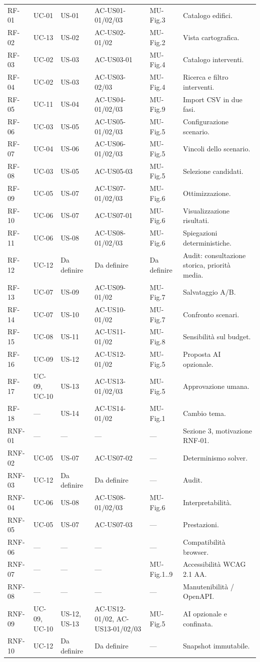\begin{longtable}{p{1.2cm} p{2.2cm} p{2.2cm} p{3.4cm} p{2.6cm} p{4cm}}
RF-01 & UC-01 & US-01 & AC-US01-01/02/03 & MU-Fig.3 & Catalogo edifici. \\
RF-02 & UC-13 & US-02 & AC-US02-01/02 & MU-Fig.2 & Vista cartografica. \\
RF-03 & UC-02 & US-03 & AC-US03-01 & MU-Fig.4 & Catalogo interventi. \\
RF-04 & UC-02 & US-03 & AC-US03-02/03 & MU-Fig.4 & Ricerca e filtro interventi. \\
RF-05 & UC-11 & US-04 & AC-US04-01/02/03 & MU-Fig.9 & Import CSV in due fasi. \\
RF-06 & UC-03 & US-05 & AC-US05-01/02/03 & MU-Fig.5 & Configurazione scenario. \\
RF-07 & UC-04 & US-06 & AC-US06-01/02/03 & MU-Fig.5 & Vincoli dello scenario. \\
RF-08 & UC-03 & US-05 & AC-US05-03 & MU-Fig.5 & Selezione candidati. \\
RF-09 & UC-05 & US-07 & AC-US07-01/02/03 & MU-Fig.6 & Ottimizzazione. \\
RF-10 & UC-06 & US-07 & AC-US07-01 & MU-Fig.6 & Visualizzazione risultati. \\
RF-11 & UC-06 & US-08 & AC-US08-01/02/03 & MU-Fig.6 & Spiegazioni deterministiche. \\
RF-12 & UC-12 & Da definire & Da definire & Da definire & Audit: consultazione storica, priorità media. \\
RF-13 & UC-07 & US-09 & AC-US09-01/02 & MU-Fig.7 & Salvataggio A/B. \\
RF-14 & UC-07 & US-10 & AC-US10-01/02 & MU-Fig.7 & Confronto scenari. \\
RF-15 & UC-08 & US-11 & AC-US11-01/02 & MU-Fig.8 & Sensibilità sul budget. \\
RF-16 & UC-09 & US-12 & AC-US12-01/02 & MU-Fig.5 & Proposta AI opzionale. \\
RF-17 & UC-09, UC-10 & US-13 & AC-US13-01/02/03 & MU-Fig.5 & Approvazione umana. \\
RF-18 & --- & US-14 & AC-US14-01/02 & MU-Fig.1 & Cambio tema. \\
\midrule
RNF-01 & --- & --- & --- & --- & Sezione 3, motivazione RNF-01. \\
RNF-02 & UC-05 & US-07 & AC-US07-02 & --- & Determinismo solver. \\
RNF-03 & UC-12 & Da definire & Da definire & --- & Audit. \\
RNF-04 & UC-06 & US-08 & AC-US08-01/02/03 & MU-Fig.6 & Interpretabilità. \\
RNF-05 & UC-05 & US-07 & AC-US07-03 & --- & Prestazioni. \\
RNF-06 & --- & --- & --- & --- & Compatibilità browser. \\
RNF-07 & --- & --- & --- & MU-Fig.1..9 & Accessibilità WCAG 2.1 AA. \\
RNF-08 & --- & --- & --- & --- & Manutenibilità / OpenAPI. \\
RNF-09 & UC-09, UC-10 & US-12, US-13 & AC-US12-01/02, AC-US13-01/02/03 & MU-Fig.5 & AI opzionale e confinata. \\
RNF-10 & UC-12 & Da definire & Da definire & --- & Snapshot immutabile. \\


\end{longtable}
